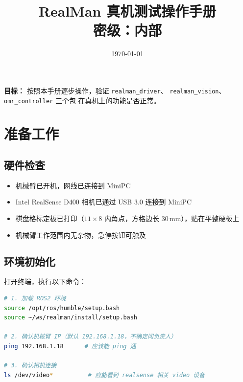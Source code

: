 \documentclass[12pt,a4paper,fontset=ubuntu]{ctexart}
\title{\Huge\textbf{RealMan 真机测试操作手册}\\[6pt]
       \large 密级：内部}
\author{}
\date{\today}
\newcommand{\chkbox}{$\square$}
\begin{document}
\maketitle

\vspace{2cm}

\begin{center}
\begin{minipage}{0.7\textwidth}
\large
\textbf{目标：} 按照本手册逐步操作，验证 \texttt{realman\_driver}、
\texttt{realman\_vision}、\texttt{omr\_controller} 三个包
在真机上的功能是否正常。
\end{minipage}
\end{center}

\vfill

\clearpage

\tableofcontents
\clearpage

\section{准备工作}

\subsection{硬件检查}

\begin{itemize}[label=\chkbox, itemsep=4pt]
  \item 机械臂已开机，网线已连接到 MiniPC
  \item Intel RealSense D400 相机已通过 USB 3.0 连接到 MiniPC
  \item 棋盘格标定板已打印（$11\times8$ 内角点，方格边长 30\,mm），贴在平整硬板上
  \item 机械臂工作范围内无杂物，急停按钮可触及
\end{itemize}

\subsection{环境初始化}

打开终端，执行以下命令：

\begin{lstlisting}[language=bash]
# 1. 加载 ROS2 环境
source /opt/ros/humble/setup.bash
source ~/ws/realman/install/setup.bash

# 2. 确认机械臂 IP（默认 192.168.1.18，不确定问负责人）
ping 192.168.1.18      # 应该能 ping 通

# 3. 确认相机连接
ls /dev/video*          # 应能看到 realsense 相关 video 设备
\end{lstlisting}
\end{document}
